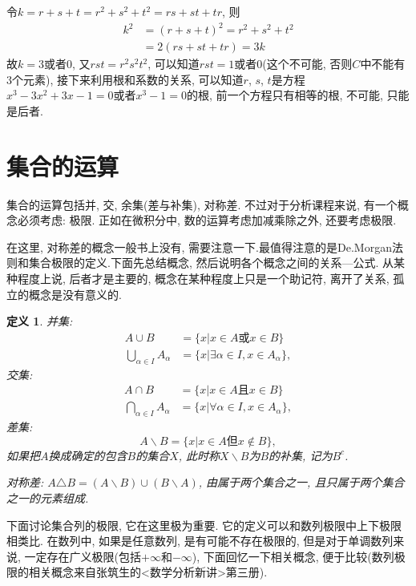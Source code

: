 \documentclass[12pt,a4paper,openany]{book}
\newtheorem{definition}{定义}[section]
\begin{document}
令$k = r + s + t = r^2 + s^2 + t^2 = rs + st + tr$, 则
$$
\begin{aligned}
k^2 &= (r + s + t)^2 = r^2 + s^2 + t^2 \\
&= 2(rs  + st + tr) = 3k
\end{aligned}
$$
故$k = 3$或者$0$, 又$rst = r^2s^2t^2$, 可以知道$rst = 1$或者$0$(这个不可能, 否则$C$中不能有3个元素), 接下来利用根和系数的关系, 可以知道$r$, $s$, $t$是方程$x^3 - 3x^2 + 3x - 1 = 0$或者$x^3 - 1= 0$的根, 前一个方程只有相等的根, 不可能, 只能是后者.

\section{集合的运算}
集合的运算包括并, 交, 余集(差与补集), 对称差. 不过对于分析课程来说, 有一个概念必须考虑: 极限. 正如在微积分中, 数的运算考虑加减乘除之外, 还要考虑极限.

在这里, 对称差的概念一般书上没有, 需要注意一下.最值得注意的是De.Morgan法则和集合极限的定义.下面先总结概念, 然后说明各个概念之间的关系---公式. 从某种程度上说, 后者才是主要的, 概念在某种程度上只是一个助记符, 离开了关系, 孤立的概念是没有意义的.

\begin{definition}
并集: 
$$
\begin{aligned}
A \cup B &= \{ x | x \in A \text{或} x \in B\} \\
\bigcup_{\alpha \in I}{A_\alpha} &= \{ x | \exists \alpha \in I, x \in A_\alpha \},
\end{aligned}
$$
交集:
$$
\begin{aligned}
A \cap B &= \{ x | x \in A \text{且} x \in B\} \\
\bigcap_{\alpha \in I}{A_\alpha} &= \{ x | \forall \alpha \in I, x \in A_\alpha \},
\end{aligned}
$$
差集:
$$
A \backslash B = \{ x | x \in A \text{但} x \notin B \},
$$
如果把$A$换成确定的包含$B$的集合$X$, 此时称$X \backslash B$为$B$的补集, 记为$B^c$.

对称差: $A \triangle B = (A \backslash B) \cup (B \backslash A)$, 由属于两个集合之一, 且只属于两个集合之一的元素组成.
\end{definition}

下面讨论集合列的极限, 它在这里极为重要. 它的定义可以和数列极限中上下极限相类比. 在数列中, 如果是任意数列, 是有可能不存在极限的, 但是对于单调数列来说, 一定存在广义极限(包括$+\infty$和$-\infty$), 下面回忆一下相关概念, 便于比较(数列极限的相关概念来自张筑生的<数学分析新讲>第三册).
\end{document}
